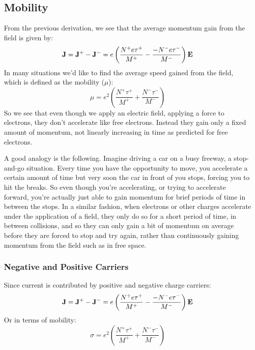 \subsection{Mobility}
From the previous derivation, we see that the average momentum gain from the field is given by:
\begin{equation}
        {\bf{J}} = {{\bf{J}}^ + } - {{\bf{J}}^ - } = e\left( {\frac{{{N^ + }e{\tau ^ + }}}{{{M^ + }}} - \frac{{ - {N^ - }e{\tau ^ - }}}{{{M^ - }}}} \right){\bf{E}}
\end{equation}
In many situations we’d like to find the average speed gained from the field, which is defined as  the mobility ($\mu$):
\begin{equation}
        \mu  = {e^2}\left( {\frac{{{N^ + }{\tau ^ + }}}{{{M^ + }}} + \frac{{{N^ - }{\tau ^ - }}}{{{M^ - }}}} \right)  
\end{equation}
So we see that even though we apply an electric field, applying a force to electrons, they don't accelerate like free electrons.  Instead they gain only a fixed amount of momentum, not linearly increasing in time as predicted for free electrons.

A good analogy is the following.  Imagine driving a car on a busy freeway, a stop-and-go situation.  Every time you have the opportunity to move, you accelerate a certain amount of time but very soon the car in front of you stops, forcing you to hit the breaks.  So even though you're accelerating, or trying to accelerate forward, you're actually just able to gain momentum for brief periods of time in between the stops.  In a similar fashion, when electrons or other charges accelerate under the application of a field, they only do so for a short period of time, in between collisions, and so they can only gain a bit of  momentum on average before they are forced to stop and try again, rather than continuously gaining momentum from the field such as in free space.
\subsubsection{Negative and Positive Carriers}
Since current is contributed by positive and negative charge carriers:
\begin{equation}
        {\bf{J}} = {{\bf{J}}^ + } - {{\bf{J}}^ - } = e\left( {\frac{{{N^ + }e{\tau ^ + }}}{{{M^ + }}} - \frac{{ - {N^ - }e{\tau ^ - }}}{{{M^ - }}}} \right){\bf{E}}
\end{equation}
Or in terms of mobility:
\begin{equation}
        \sigma  = {e^2}\left( {\frac{{{N^ + }{\tau ^ + }}}{{{M^ + }}} + \frac{{{N^ - }{\tau ^ - }}}{{{M^ - }}}} \right)
\end{equation}
